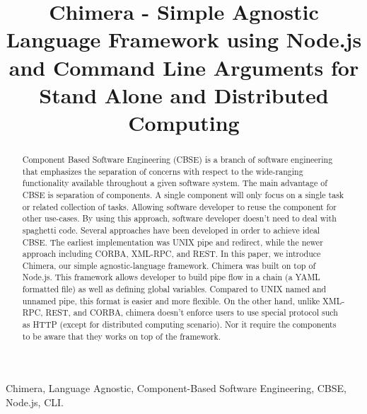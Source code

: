 \documentclass[conference]{IEEEtran}
\begin{document}
\title{Chimera - Simple Agnostic Language Framework using Node.js and Command Line 
Arguments for Stand Alone and Distributed Computing}

\author{
\and
{}
\and
{}
}

\maketitle


\begin{abstract}
Component Based Software Engineering (CBSE) is a branch of software 
engineering that emphasizes the separation of concerns with respect to the 
wide-ranging functionality available throughout a given software system.  The 
main advantage of CBSE is separation of components. A single component will 
only focus on a single task or related collection of tasks. Allowing software 
developer to reuse the component for other use-cases. By using this approach, 
software developer doesn't need to deal with spaghetti code. Several 
approaches have been developed in order to achieve ideal CBSE. The earliest 
implementation was UNIX pipe and redirect, while the newer approach including 
CORBA, XML-RPC, and REST. In this paper, we introduce Chimera, our simple 
agnostic-language framework. Chimera was built on top of Node.js. This framework
    allows developer to build pipe flow in a chain (a YAML formatted file) 
as well as defining global variables. Compared to UNIX named and unnamed pipe, 
this format is easier and more flexible. On the other hand, unlike XML-RPC, 
REST, and CORBA, chimera doesn't enforce users to use special protocol such as 
HTTP (except for distributed computing scenario). Nor it require the components
to be aware that they works on top of the framework.
\end{abstract}

\begin{IEEEkeywords}
Chimera, Language Agnostic, Component-Based Software Engineering, CBSE, Node.js, CLI.
\end{IEEEkeywords}
\end{document}
